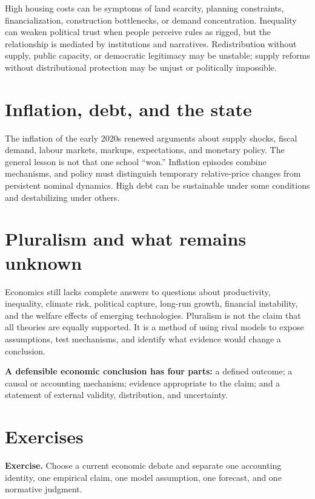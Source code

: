 \documentclass[11pt,oneside,openany]{book}
\newcommand{\exercise}[1]{\textbf{Exercise.} #1}
\begin{document}
High housing costs can be symptoms of land scarcity, planning constraints, financialization, construction bottlenecks, or demand concentration. Inequality can weaken political trust when people perceive rules as rigged, but the relationship is mediated by institutions and narratives. Redistribution without supply, public capacity, or democratic legitimacy may be unstable; supply reforms without distributional protection may be unjust or politically impossible.

\section{Inflation, debt, and the state}

The inflation of the early 2020s renewed arguments about supply shocks, fiscal demand, labour markets, markups, expectations, and monetary policy. The general lesson is not that one school ``won.'' Inflation episodes combine mechanisms, and policy must distinguish temporary relative-price changes from persistent nominal dynamics. High debt can be sustainable under some conditions and destabilizing under others.

\section{Pluralism and what remains unknown}

Economics still lacks complete answers to questions about productivity, inequality, climate risk, political capture, long-run growth, financial instability, and the welfare effects of emerging technologies. Pluralism is not the claim that all theories are equally supported. It is a method of using rival models to expose assumptions, test mechanisms, and identify what evidence would change a conclusion.

\begin{keybox}
\textbf{A defensible economic conclusion has four parts:} a defined outcome; a causal or accounting mechanism; evidence appropriate to the claim; and a statement of external validity, distribution, and uncertainty.
\end{keybox}

\section{Exercises}

\exercise{Choose a current economic debate and separate one accounting identity, one empirical claim, one model assumption, one forecast, and one normative judgment.}
\end{document}
